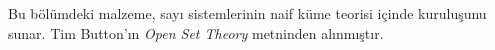 \documentclass[../../../include/open-logic-section]{subfiles}
\begin{document}
	

\begin{editorial}
Bu bölümdeki malzeme, sayı sistemlerinin naif küme teorisi içinde
kuruluşunu sunar. Tim Button'ın \emph{Open Set Theory} metninden
alınmıştır.
\end{editorial}


\OLEndChapterHook
\end{document}
